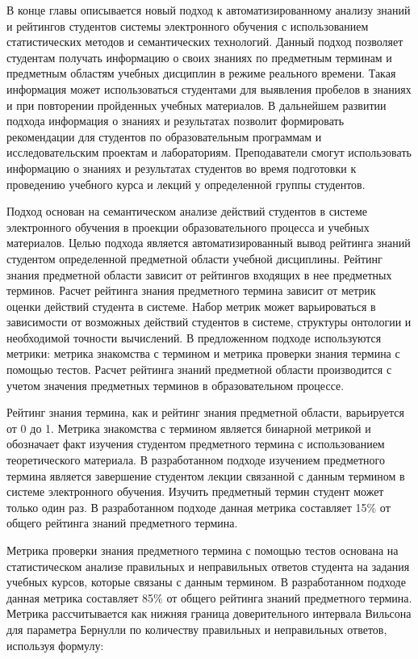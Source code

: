 В конце главы описывается новый подход к автоматизированному анализу знаний и рейтингов студентов системы электронного обучения с использованием статистических методов и семантических технологий. Данный подход позволяет студентам получать информацию о своих знаниях по предметным терминам и предметным областям учебных дисциплин в режиме реального времени. Такая информация может использоваться студентами для выявления пробелов в знаниях и при повторении пройденных учебных материалов. В дальнейшем развитии подхода информация о знаниях и результатах позволит формировать рекомендации для студентов по образовательным программам и исследовательским проектам и лабораториям. Преподаватели смогут использовать информацию о знаниях и результатах студентов во время подготовки к проведению учебного курса и лекций у определенной группы студентов.

Подход основан на семантическом анализе действий студентов в системе электронного обучения в проекции образовательного процесса и учебных материалов. Целью подхода является автоматизированный вывод рейтинга знаний студентом определенной предметной области учебной дисциплины. Рейтинг знания предметной области зависит от рейтингов входящих в нее предметных терминов. Расчет рейтинга знания предметного термина зависит от метрик оценки действий студента в системе. Набор метрик может варьироваться в зависимости от возможных действий студентов в системе, структуры онтологии и необходимой точности вычислений. В предложенном подходе используются метрики: метрика знакомства с термином и метрика проверки знания термина с помощью тестов. Расчет рейтинга знаний предметной области производится с учетом значения предметных терминов в образовательном процессе.

Рейтинг знания термина, как и рейтинг знания предметной области, варьируется от 0 до 1. Метрика знакомства с термином является бинарной метрикой и обозначает факт изучения студентом предметного термина с использованием теоретического материала. В разработанном подходе изучением предметного термина является завершение студентом лекции связанной с данным термином в системе электронного обучения. Изучить предметный термин студент может только один раз. В разработанном подходе данная метрика составляет 15\% от общего рейтинга знаний предметного термина.

Метрика проверки знания предметного термина с помощью тестов основана на статистическом анализе правильных и неправильных ответов студента на задания учебных курсов, которые связаны с данным термином. В разработанном подходе данная метрика составляет 85\% от общего рейтинга знаний предметного термина. Метрика рассчитывается как нижняя граница доверительного интервала Вильсона для параметра Бернулли по количеству правильных и неправильных ответов, используя формулу:

